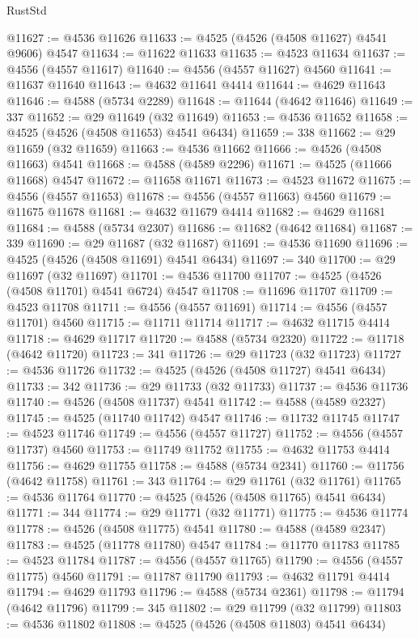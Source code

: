 \begin{lexlean}{RustStd}
\begin{coremodule}
{\begin{coremodule}
{{{{{{{{{{{{{{{{{{{{{{{{{{{{{{{{{{{{{{{{{{{{{{{{{{{{{{{@11627 := @4536 @11626
@11633 := @4525 (@4526 (@4508 @11627) @4541 @9606) @4547
@11634 := @11622 @11633
@11635 := @4523 @11634
@11637 := @4556 (@4557 @11617)
@11640 := @4556 (@4557 @11627) @4560
@11641 := @11637 @11640
@11643 := @4632 @11641 @4414
@11644 := @4629 @11643
@11646 := @4588 (@5734 @2289)
@11648 := @11644 (@4642 @11646)
@11649 := 337
@11652 := @29 @11649 (@32 @11649)
@11653 := @4536 @11652
@11658 := @4525 (@4526 (@4508 @11653) @4541 @6434)
@11659 := 338
@11662 := @29 @11659 (@32 @11659)
@11663 := @4536 @11662
@11666 := @4526 (@4508 @11663) @4541
@11668 := @4588 (@4589 @2296)
@11671 := @4525 (@11666 @11668) @4547
@11672 := @11658 @11671
@11673 := @4523 @11672
@11675 := @4556 (@4557 @11653)
@11678 := @4556 (@4557 @11663) @4560
@11679 := @11675 @11678
@11681 := @4632 @11679 @4414
@11682 := @4629 @11681
@11684 := @4588 (@5734 @2307)
@11686 := @11682 (@4642 @11684)
@11687 := 339
@11690 := @29 @11687 (@32 @11687)
@11691 := @4536 @11690
@11696 := @4525 (@4526 (@4508 @11691) @4541 @6434)
@11697 := 340
@11700 := @29 @11697 (@32 @11697)
@11701 := @4536 @11700
@11707 := @4525 (@4526 (@4508 @11701) @4541 @6724) @4547
@11708 := @11696 @11707
@11709 := @4523 @11708
@11711 := @4556 (@4557 @11691)
@11714 := @4556 (@4557 @11701) @4560
@11715 := @11711 @11714
@11717 := @4632 @11715 @4414
@11718 := @4629 @11717
@11720 := @4588 (@5734 @2320)
@11722 := @11718 (@4642 @11720)
@11723 := 341
@11726 := @29 @11723 (@32 @11723)
@11727 := @4536 @11726
@11732 := @4525 (@4526 (@4508 @11727) @4541 @6434)
@11733 := 342
@11736 := @29 @11733 (@32 @11733)
@11737 := @4536 @11736
@11740 := @4526 (@4508 @11737) @4541
@11742 := @4588 (@4589 @2327)
@11745 := @4525 (@11740 @11742) @4547
@11746 := @11732 @11745
@11747 := @4523 @11746
@11749 := @4556 (@4557 @11727)
@11752 := @4556 (@4557 @11737) @4560
@11753 := @11749 @11752
@11755 := @4632 @11753 @4414
@11756 := @4629 @11755
@11758 := @4588 (@5734 @2341)
@11760 := @11756 (@4642 @11758)
@11761 := 343
@11764 := @29 @11761 (@32 @11761)
@11765 := @4536 @11764
@11770 := @4525 (@4526 (@4508 @11765) @4541 @6434)
@11771 := 344
@11774 := @29 @11771 (@32 @11771)
@11775 := @4536 @11774
@11778 := @4526 (@4508 @11775) @4541
@11780 := @4588 (@4589 @2347)
@11783 := @4525 (@11778 @11780) @4547
@11784 := @11770 @11783
@11785 := @4523 @11784
@11787 := @4556 (@4557 @11765)
@11790 := @4556 (@4557 @11775) @4560
@11791 := @11787 @11790
@11793 := @4632 @11791 @4414
@11794 := @4629 @11793
@11796 := @4588 (@5734 @2361)
@11798 := @11794 (@4642 @11796)
@11799 := 345
@11802 := @29 @11799 (@32 @11799)
@11803 := @4536 @11802
@11808 := @4525 (@4526 (@4508 @11803) @4541 @6434)
}}}}}}}}}}}}}}}}}}}}}}}}}}}}}}}}}}}}}}}}}}}}}}}}}}}}}}}
\end{coremodule}}
\end{coremodule}
\end{lexlean}
